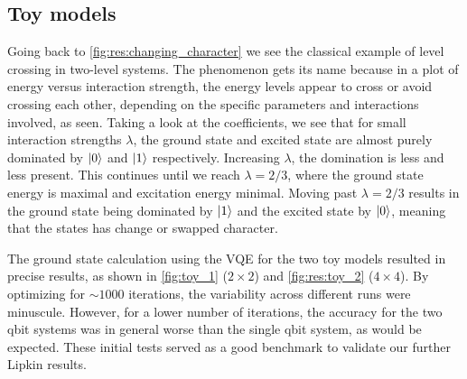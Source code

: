 \label{sec:discussion}
\subsection{Toy models}
Going back to \cref{fig:res:changing_character} we see the classical example of level crossing in two-level systems. The phenomenon gets its name because in a plot of energy versus interaction strength, the energy levels appear to cross or avoid crossing each other, depending on the specific parameters and interactions involved, as seen. Taking a look at the coefficients, we see that for small interaction strengths $\lambda$, the ground state and excited state are almost purely dominated by $\ket{0}$ and $\ket{1}$ respectively. Increasing $\lambda$, the domination is less and less present. This continues until we reach $\lambda = 2/3$, where the ground state energy is maximal and excitation energy minimal. Moving past  $\lambda = 2/3$ results in the ground state being dominated by $\ket{1}$ and the excited state by $\ket{0}$, meaning that the states has change or swapped character.

The ground state calculation using the VQE for the two toy models resulted in precise results, as shown in \cref{fig:toy_1} ($2\times 2$) and \cref{fig:res:toy_2} ($4 \times 4$). By optimizing for $\sim 1000$ iterations, the variability across different runs were minuscule. However, for a lower number of iterations, the accuracy for the two qbit systems was in general worse than the single qbit system, as would be expected. These initial tests served as a good benchmark to validate our further Lipkin results.

